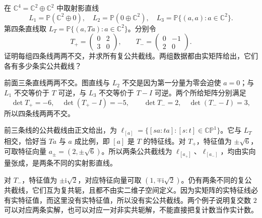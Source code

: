 \begin{exercise}\label{g2:ex:real-four-lines-count}
	在 \(\mathbb C^4=\mathbb C^2\oplus\mathbb C^2\) 中取射影直线
	\[
		L_1=\mathbb P(\mathbb C^2\oplus0),\quad L_2=\mathbb P(0\oplus\mathbb C^2),\quad L_3=\mathbb P\{(a,a):a\in\mathbb C^2\}.
	\]
	第四条直线取 \(L_T=\mathbb P\{(a,Ta):a\in\mathbb C^2\}\)。分别令
	\[
		T_+=\begin{pmatrix}0&2\\3&0\end{pmatrix},\qquad
		T_-=\begin{pmatrix}0&-1\\2&0\end{pmatrix}.
	\]
	证明每组四条线两两不交，并求所有复公共截线。两组数据都由实矩阵给出，它们各有多少条实公共截线？
\end{exercise}
\begin{solution}
	前面三条直线两两不交。图直线与 \(L_2\) 不交是因为第一分量为零会迫使 \(a=0\)；与 \(L_1\) 不交等价于 \(T\) 可逆，与 \(L_3\) 不交等价于 \(T-I\) 可逆。两个所给矩阵分别满足
	\[
		\det T_+=-6,\quad\det(T_+-I)=-5,\qquad
		\det T_-=2,\quad\det(T_--I)=3,
	\]
	所以四条线两两不交。

	前三条线的公共截线由正文给出，为 \(\ell_{[a]}=\{[sa:ta]:[s:t]\in\mathbb{CP}^1\}\)。它与 \(L_T\) 相交，恰好当 \(Ta\) 与 \(a\) 成比例，即 \([a]\) 是 \(T\) 的特征线。对 \(T_+\)，特征值为 \(\pm\sqrt6\)，可取特征向量 \(a_\pm=(2,\pm\sqrt6)\)。所以两条公共截线为 \(\ell_{[a_+]}\)、\(\ell_{[a_-]}\)，均由实向量张成，是两条不同的实射影直线。

	对 \(T_-\)，特征值为 \(\pm\mathrm i\sqrt2\)，对应特征向量可取 \((1,\mp\mathrm i\sqrt2)\)。仍有两条不同的复公共截线，它们互为复共轭，且都不由实二维子空间定义。因为实矩阵的实特征线必有实特征值，而这里没有实特征值，所以没有实公共截线。两个例子说明复交数 \(2\) 可以对应两条实解，也可以对应一对非实共轭解，不能直接把复计数当作实计数。
\end{solution}
